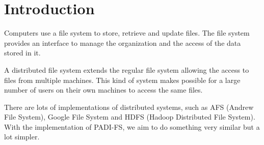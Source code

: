 \section{Introduction}

Computers use a file system to store, retrieve and update files. The file
system provides an interface to manage the organization and the access of
the data stored in it.

A distributed file system extends the regular file system allowing the
access to files from multiple machines. This kind of system makes possible
for a large number of users on their own machines to access the same files.

There are lots of implementations of distributed systems, such as AFS 
(Andrew File System), Google File System and HDFS (Hadoop Distributed File 
System). With the implementation of PADI-FS, we aim to do something very
similar but a lot simpler.